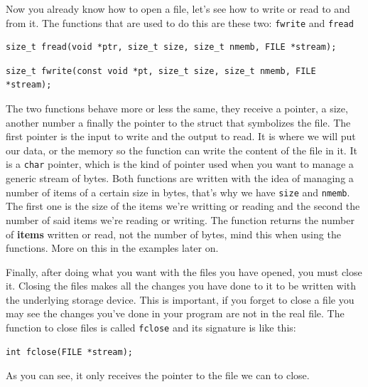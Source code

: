 \documentclass[a4paper]{article}
\begin{document}
Now you already know how to open a file, let's see how to write or read to and
from it. The functions that are used to do this are these two: \verb!fwrite!
and \verb!fread!

\noindent
\begin{minipage}[H]{\linewidth}
\mbox{}
\begin{lstlisting}[style=C,
caption={\texttt{fread} function signature},
label={lst:freadSignature}]
size_t fread(void *ptr, size_t size, size_t nmemb, FILE *stream);
\end{lstlisting}
\end{minipage}

\noindent
\begin{minipage}[H]{\linewidth}
\mbox{}
\begin{lstlisting}[style=C,
caption={\texttt{fwrite} function signature},
label={lst:fwriteSignature}]
size_t fwrite(const void *pt, size_t size, size_t nmemb, FILE *stream);
\end{lstlisting}
\end{minipage}

The two functions behave more or less the same, they receive a pointer, a size,
another number a finally the pointer to the struct that symbolizes the file.
The first pointer is the input to write and the output to read. It is where we
will put our data, or the memory so the function can write the content
of the file in it. It is a \verb!char! pointer, which is the kind of pointer
used when you want to manage a generic stream of bytes. Both functions are
written with the idea of managing a number of items of a certain size in
bytes, that's why we have \verb!size! and \verb!nmemb!. The first one is the
size of the items we're writting or reading and the second the number
of said items we're reading or writing. The function returns the number of
\textbf{items} written or read, not the number of bytes, mind this when
using the functions.
More on this in the examples later on.

Finally, after doing what you want with the files you have opened, you must
close it. Closing the files makes all the changes you have done to it to be
written with the underlying storage device. This is important, if you forget to
close a file you may see the changes you've done in your program are not
in the real file. The function to close files is called \verb!fclose! and its
signature is like this:

\noindent
\begin{minipage}[H]{\linewidth}
\mbox{}
\begin{lstlisting}[style=C,
caption={\texttt{fclose} signature},
label={lst:fcloseSignature}]
int fclose(FILE *stream);
\end{lstlisting}
\end{minipage}
As you can see, it only receives the pointer to the file we can to close.
\end{document}
